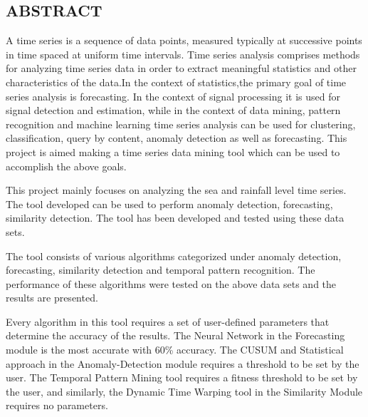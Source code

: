\documentclass[12pt,a4paper]{report}
\begin{document}
\begin{center}
\section*{ABSTRACT}
\end{center} 
A time series is a sequence of data points, measured typically at successive points in time spaced at uniform time intervals. Time series analysis comprises methods for analyzing time series data in order to extract meaningful statistics and other characteristics of the data.In the context of statistics,the primary goal of time series analysis is forecasting. In the context of signal processing it is used for signal detection and estimation, while in the context of data mining, pattern recognition and machine learning time series analysis can be used for clustering, classification, query by content, anomaly detection as well as forecasting. This project is aimed making a time series data mining tool which can be used to accomplish the above goals. 



This project mainly focuses on analyzing the sea and rainfall level time series. 
The tool developed can be used to perform anomaly detection, forecasting, similarity detection. The tool has been developed and tested using these data sets.


The tool consists of various algorithms categorized under anomaly detection, forecasting, similarity detection and temporal pattern recognition. The performance of these algorithms were tested on the above data sets and the results are presented. 


Every algorithm in this tool requires a set of user-defined parameters that determine the accuracy of the results. The Neural Network in the Forecasting module is the most accurate with 60\% accuracy. The CUSUM and Statistical approach in the Anomaly-Detection module requires a threshold to be set by the user. The Temporal Pattern Mining tool requires a fitness threshold to be set by the user, and similarly, the Dynamic Time Warping tool in the Similarity Module requires no parameters.


\tableofcontents

\newpage
{}
\listoffigures

\newpage
{}
\listoftables
\end{document}
